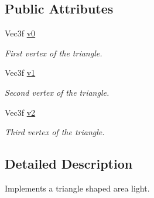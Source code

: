 \subsection*{Public Attributes}
\begin{DoxyCompactItemize}
\item 
\hypertarget{classembree_1_1_triangle_light_a3b90184aafbe9c89960e0a453f6bd18e}{
Vec3f \hyperlink{classembree_1_1_triangle_light_a3b90184aafbe9c89960e0a453f6bd18e}{v0}}
\label{classembree_1_1_triangle_light_a3b90184aafbe9c89960e0a453f6bd18e}

\begin{DoxyCompactList}\small\item\em First vertex of the triangle. \item\end{DoxyCompactList}\item 
\hypertarget{classembree_1_1_triangle_light_ae0769df4964af61388c732afc9e8ec82}{
Vec3f \hyperlink{classembree_1_1_triangle_light_ae0769df4964af61388c732afc9e8ec82}{v1}}
\label{classembree_1_1_triangle_light_ae0769df4964af61388c732afc9e8ec82}

\begin{DoxyCompactList}\small\item\em Second vertex of the triangle. \item\end{DoxyCompactList}\item 
\hypertarget{classembree_1_1_triangle_light_a3ef87da2dfb896302ad28f52027d70f4}{
Vec3f \hyperlink{classembree_1_1_triangle_light_a3ef87da2dfb896302ad28f52027d70f4}{v2}}
\label{classembree_1_1_triangle_light_a3ef87da2dfb896302ad28f52027d70f4}

\begin{DoxyCompactList}\small\item\em Third vertex of the triangle. \item\end{DoxyCompactList}\end{DoxyCompactItemize}


\subsection{Detailed Description}
Implements a triangle shaped area light. 

